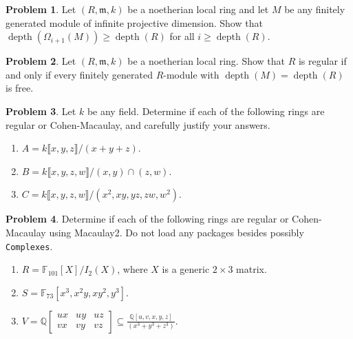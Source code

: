 \documentclass[11pt]{article}
\newcommand{\m}{\mathfrak{m}}
\DeclareMathOperator{\depth}{depth}
\theoremstyle{definition}
\newtheorem{problem}{Problem}
\begin{document}
\vfill

\begin{problem}
Let $(R, \m, k)$ be a noetherian local ring and let $M$ be any finitely generated module of infinite projective dimension. Show that $\depth(\Omega_{i+1}(M)) \geqslant \depth(R)$ for all $i \geqslant \depth(R)$.
\end{problem}


\begin{problem}
	Let $(R, \m, k)$ be a noetherian local ring. Show that $R$ is regular if and only if every finitely generated $R$-module with $\depth(M) = \depth(R)$ is free.
\end{problem}



\vfill


\begin{problem}
	Let $k$ be any field. Determine if each of the following rings are regular or Cohen-Macaulay, and carefully justify your answers.
	\begin{enumerate}[label=\alph*), itemsep=-0.1em]
		\item $A = k \llbracket x,y,z \rrbracket /(x+y+z)$.
		\item $B = k \llbracket x,y,z,w \rrbracket/(x,y) \cap (z,w)$.
		\item $C = k \llbracket x,y,z,w \rrbracket/(x^2,xy,yz,zw,w^2)$.
	\end{enumerate}
\end{problem}


\newpage

\begin{problem}
	Determine if each of the following rings are regular or Cohen-Macaulay using Macaulay2. Do not load any packages besides possibly \texttt{Complexes}.
	
	\begin{enumerate}[label=\alph*), itemsep=-0.1em]
		\item $R = \mathbb{F}_{101}[ X ]/I_2(X)$, where $X$ is a generic $2 \times 3$ matrix.
		\item $S = \mathbb{F}_{73}[x^3, x^2y, xy^2, y^3]$.
		\item $V = \mathbb{Q} \begin{bmatrix} ux & uy & uz \\ vx & vy & vz \end{bmatrix} \subseteq \frac{\mathbb{Q}[u,v,x,y,z]}{(x^3+y^3+z^3)}$.
	\end{enumerate}
\end{problem}
 
\end{document}

